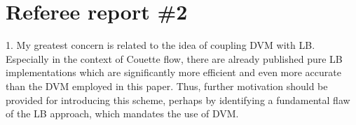 \documentclass{article}
\begin{document}
\section*{Referee report \#2}

\begin{quoting}
    1. My greatest concern is related to the idea of coupling
    DVM with LB. Especially in the context of Couette flow,
    there are already published pure LB implementations which
    are significantly more efficient and even more accurate
    than the DVM employed in this paper. Thus, further
    motivation should be provided for introducing this scheme,
    perhaps by identifying a fundamental flaw of the LB approach,
    which mandates the use of DVM.
\end{quoting}

%
%

\end{document}
